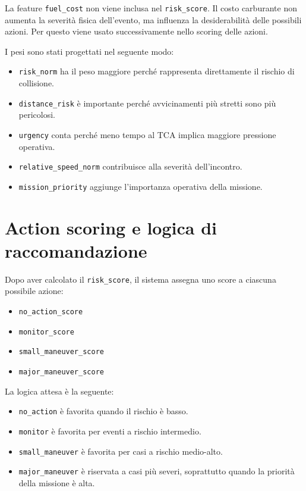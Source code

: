 \documentclass[12pt,a4paper]{article}
\begin{document}
La feature \texttt{fuel\_cost} non viene inclusa nel \texttt{risk\_score}. Il costo carburante non aumenta la severità fisica dell'evento, ma influenza la desiderabilità delle possibili azioni. Per questo viene usato successivamente nello scoring delle azioni.

I pesi sono stati progettati nel seguente modo:

\begin{itemize}
    \item \texttt{risk\_norm} ha il peso maggiore perché rappresenta direttamente il rischio di collisione.
    \item \texttt{distance\_risk} è importante perché avvicinamenti più stretti sono più pericolosi.
    \item \texttt{urgency} conta perché meno tempo al TCA implica maggiore pressione operativa.
    \item \texttt{relative\_speed\_norm} contribuisce alla severità dell'incontro.
    \item \texttt{mission\_priority} aggiunge l'importanza operativa della missione.
\end{itemize}

\section{Action scoring e logica di raccomandazione}

Dopo aver calcolato il \texttt{risk\_score}, il sistema assegna uno score a ciascuna possibile azione:

\begin{itemize}
    \item \texttt{no\_action\_score}
    \item \texttt{monitor\_score}
    \item \texttt{small\_maneuver\_score}
    \item \texttt{major\_maneuver\_score}
\end{itemize}

La logica attesa è la seguente:

\begin{itemize}
    \item \texttt{no\_action} è favorita quando il rischio è basso.
    \item \texttt{monitor} è favorita per eventi a rischio intermedio.
    \item \texttt{small\_maneuver} è favorita per casi a rischio medio-alto.
    \item \texttt{major\_maneuver} è riservata a casi più severi, soprattutto quando la priorità della missione è alta.
\end{itemize}
\end{document}
